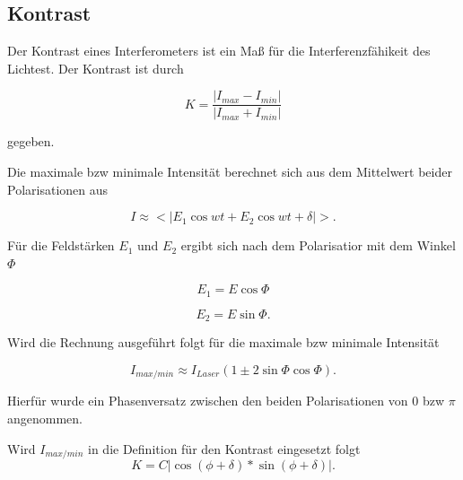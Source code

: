 \subsection{Kontrast}
Der Kontrast eines Interferometers ist ein Maß für die Interferenzfähikeit des Lichtest. Der Kontrast ist durch

\begin{equation}
K = \frac{|I_{max} - I_{min}|}{|I_{max} + I_{min}|}
\label{kontra}
\end{equation}

gegeben.

Die maximale bzw minimale Intensität berechnet sich aus dem Mittelwert beider Polarisationen aus

\begin{equation}
I \approx  <|E_1 \cos{wt} + E_2 \cos{wt + \delta} |>.
\end{equation}

Für die Feldstärken $E_1$ und $E_2$ ergibt sich nach dem Polarisatior mit dem Winkel $\Phi$

\begin{equation}
E_1 = E \cos{\Phi}
\end{equation}

\begin{equation}
E_2 = E \sin{\Phi}.
\end{equation}

Wird die Rechnung ausgeführt folgt für die maximale bzw minimale Intensität

\begin{equation}
I_{max/min} \approx I_{Laser} \left( 1 \pm 2 \sin{\Phi} \cos{\Phi} \right).
\end{equation}

Hierfür wurde ein Phasenversatz zwischen den beiden Polarisationen von $0$ bzw $\pi$ angenommen.

Wird $I_{max/min}$ in die Definition für den Kontrast eingesetzt folgt
\begin{equation}
K = C|\cos(\phi + \delta) * \sin(\phi + \delta)|.
\end{equation}
